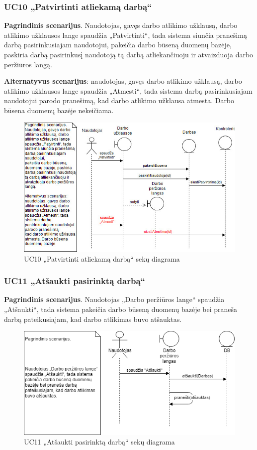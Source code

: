 \documentclass{VUMIFPSbakalaurinis}
\begin{document}
\subsubsection{UC10 „Patvirtinti atliekamą darbą“}
\textbf{Pagrindinis scenarijus}. Naudotojas, gavęs darbo atlikimo užklausą, darbo atlikimo užklausos lange spaudžia „Patvirtinti“, tada sistema siunčia pranešimą darbą pasirinkusiajam naudotojui, pakeičia darbo būseną duomenų bazėje, paskiria darbą pasirinkusį naudotoją tą darbą atliekančiuoju ir atvaizduoja darbo peržiūros langą. 
\par \textbf{Alternatyvus scenarijus}: naudotojas, gavęs darbo atlikimo užklausą, darbo atlikimo užklausos lange spaudžia „Atmesti“, tada sistema darbą pasirinkusiajam naudotojui parodo pranešimą, kad darbo atlikimo užklausa atmesta. Darbo būsena duomenų bazėje nekeičiama.

\begin{figure}[H]
	\centering
	\includegraphics[scale=0.6]{img/Sequence/10sequence}
	\caption{UC10 „Patvirtinti atliekamą darbą“ sekų diagrama}
	\label{img:uc10seq}
\end{figure}

\subsubsection{UC11 „Atšaukti pasirinktą darbą“}
\textbf{Pagrindinis scenarijus}. Naudotojas „Darbo peržiūros lange“ spaudžia „Atšaukti“, tada sistema pakeičia darbo būseną duomenų bazėje bei praneša darbą pateikusiajam, kad darbo atlikimas buvo atšauktas.

\begin{figure}[H]
	\centering
	\includegraphics[scale=0.6]{img/Sequence/SD11}
	\caption{UC11 „Atšaukti pasirinktą darbą“ sekų diagrama}
	\label{img:uc11seq}
\end{figure}
\end{document}
